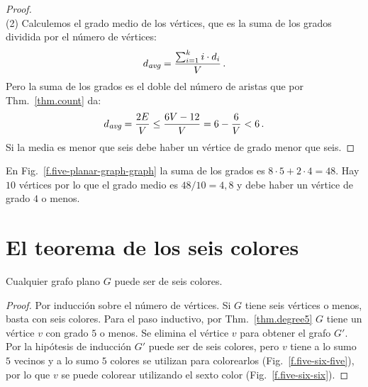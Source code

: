 {{\begin{proof}
\mbox{}\\
(2)
Calculemos el grado medio de los vértices, que es la suma de los grados dividida por el número de vértices:
\[
d_{\textit{\footnotesize avg}}=\frac{\sum_{i=1}^{k} i\cdot d_i}{V}\,.
\]
Pero la suma de los grados es el doble del número de aristas que por Thm.~\ref{thm.count} da:
\[
d_{\textit{\footnotesize avg}}=\frac{2E}{V}\leq \frac{6V-12}{V}=6-\frac{6}{V}<6\,.
\]
Si la media es menor que seis debe haber un vértice de grado menor que seis.
\end{proof}

\begin{example}
En Fig.~\ref{f.five-planar-graph-graph} la suma de los grados es $8\cdot 5 + 2\cdot 4=48$. Hay $10$ vértices por lo que el grado medio es $48/10=4,8$ y debe haber un vértice de grado $4$ o menos.
\end{example}


\section{El teorema de los seis colores}\label{s.six-color}

\begin{theorem}\label{thm.sixcolor}
Cualquier grafo plano $G$ puede ser de seis colores.
\end{theorem}
\begin{proof}
Por inducción sobre el número de vértices. Si $G$ tiene seis vértices o menos, basta con seis colores.
Para el paso inductivo, por Thm.~\ref{thm.degree5} $G$ tiene un vértice $v$ con grado $5$ o menos. Se elimina el vértice $v$ para obtener el grafo $G'$. Por la hipótesis de inducción $G'$ puede ser de seis colores, pero $v$ tiene a lo sumo $5$ vecinos y a lo sumo $5$ colores se utilizan para colorearlos (Fig.~\ref{f.five-six-five}), por lo que $v$ se puede colorear utilizando el sexto color (Fig.~\ref{f.five-six-six}).
\end{proof}

}}
